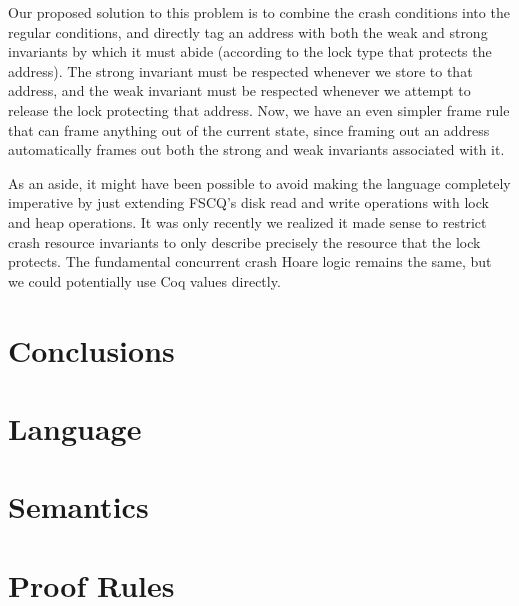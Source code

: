 Our proposed solution to this problem is to combine the crash conditions into
the regular conditions, and directly tag an address with both the weak and
strong invariants by which it must abide (according to the lock type that
protects the address).
The strong invariant must be respected whenever we store
to that address, and the weak invariant must be respected whenever we attempt to
release the lock protecting that address.
Now, we have an even simpler frame
rule that can frame anything out of the current state, since framing out an
address automatically frames out both the strong and weak invariants associated
with it.

As an aside, it might have been possible to avoid making the language completely
imperative by just extending FSCQ's disk read and write operations with lock and
heap operations.
It was only recently we realized it made sense to restrict
crash resource invariants to only describe precisely the resource that the lock
protects.
The fundamental concurrent crash Hoare logic remains the same, but we
could potentially use Coq values directly.

\section{Conclusions}

\appendix
\section{Language}
\section{Semantics}
\section{Proof Rules}
